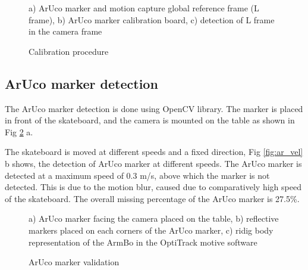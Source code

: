 \documentclass[12pt, twoside]{report}
\begin{document}
\begin{figure}[h!]
    \centering
    \caption{Calibration procedure}
    {a) ArUco marker and motion capture global reference frame (L frame),
        b) ArUco marker calibration board, c) detection of L frame in the camera frame}
    \label{fig:lframe}
\end{figure}


\subsection{ArUco marker detection}
The ArUco marker detection is done using OpenCV library. The marker is placed
in front of the skateboard, and the camera is mounted on the table as shown in Fig \ref{fig:ar_mc} a.

The skateboard
is moved at different speeds and a fixed direction, Fig \ref{fig:ar_vel} b shows, the detection
of ArUco marker at different speeds. The ArUco marker is detected at a maximum speed of 0.3 m/s,
above which the marker is not detected. This is due to the motion blur, caused due to comparatively
high speed of the skateboard. The overall missing percentage of the ArUco marker is 27.5\%.


\begin{figure}
    \centering
    \caption{ArUco marker validation}
    {a) ArUco marker facing the camera placed on the table,
        b) reflective markers placed on each corners of the ArUco marker,
        c) ridig body representation of the ArmBo in the OptiTrack motive software}
    \label{fig:ar_mc}
\end{figure}
\end{document}
